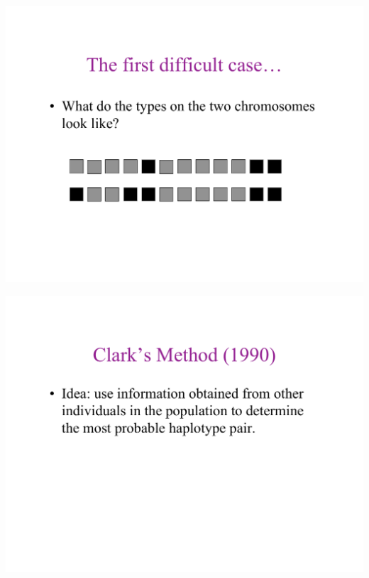 \newslide{}
\mbox{}
\vspace*{\VertUp}
\enlargethispage*{1000pt}
\begin{center}
\includegraphics*[width=\textwidth]{PPT_pages/pg_0015.pdf}
\end{center}


\newslide{}
\mbox{}
\vspace*{\VertUp}
\enlargethispage*{1000pt}
\begin{center}
\includegraphics*[width=\textwidth]{PPT_pages/pg_0016.pdf}
\end{center}


